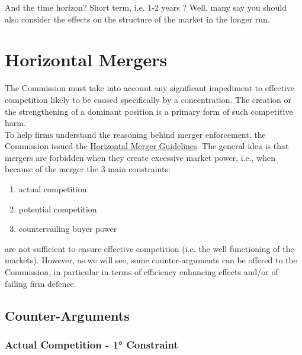 
        And the time horizon? Short term, i.e. 1-2 years ? Well, many say you should also consider the effects on the structure of the market in the longer run.

\section{Horizontal Mergers}

    The Commission must take into account any significant impediment to effective competition likely to be caused specifically by a concentration. The creation or the strengthening of a dominant position is a primary form of such competitive harm. \\

    To help firms understand the reasoning behind merger enforcement, the Commission issued the \href{https://drive.google.com/drive/folders/1AlOhjGwM_ZBajGQE6hfb-pc5aUMtSGW9?usp=share_link}{Horizontal Merger Guidelines}. The general idea is that mergers are forbidden when they create excessive market power, i.e., when because of the merger the 3 main constraints:

        \begin{enumerate}
            \item actual competition
            \item potential competition
            \item countervailing buyer power
        \end{enumerate}

    are not sufficient to ensure effective competition (i.e. the well functioning of the markets). However, as we will see, some counter-arguments can be offered to the Commission, in particular in terms of efficiency enhancing effects and/or of failing firm defence.

    \subsection*{Counter-Arguments}

        \subsubsection{Actual Competition - \textcolor{BrickRed}{1° Constraint}}

